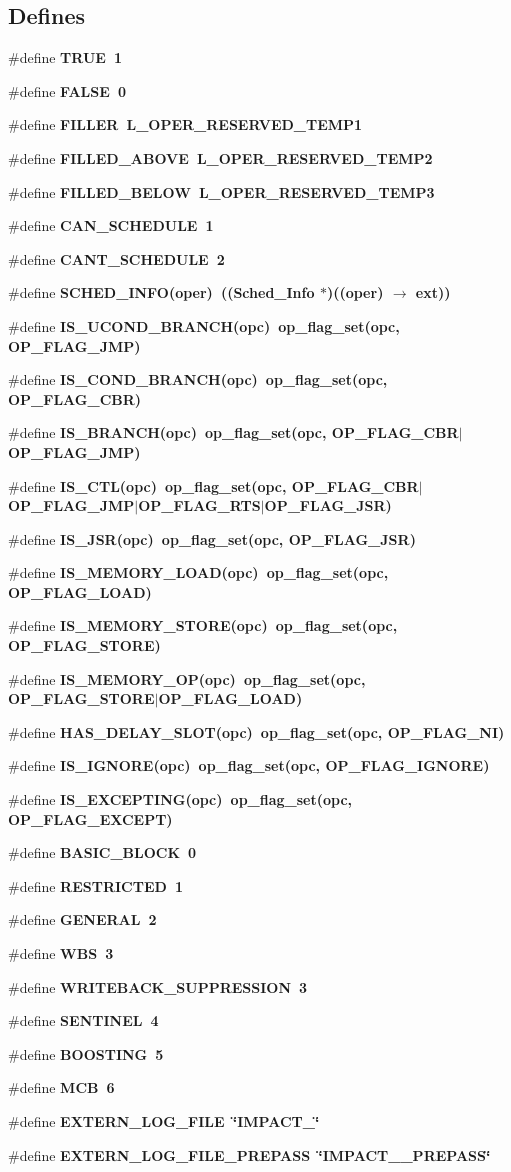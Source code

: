 \subsection*{Defines}
\begin{CompactItemize}
\item 
\#define \bf{TRUE}~1
\item 
\#define \bf{FALSE}~0
\item 
\#define \bf{FILLER}~L\_\-OPER\_\-RESERVED\_\-TEMP1
\item 
\#define \bf{FILLED\_\-ABOVE}~L\_\-OPER\_\-RESERVED\_\-TEMP2
\item 
\#define \bf{FILLED\_\-BELOW}~L\_\-OPER\_\-RESERVED\_\-TEMP3
\item 
\#define \bf{CAN\_\-SCHEDULE}~1
\item 
\#define \bf{CANT\_\-SCHEDULE}~2
\item 
\#define \bf{SCHED\_\-INFO}(oper)~((\bf{Sched\_\-Info} $\ast$)((oper) $\rightarrow$ ext))
\item 
\#define \bf{IS\_\-UCOND\_\-BRANCH}(opc)~op\_\-flag\_\-set(opc, OP\_\-FLAG\_\-JMP)
\item 
\#define \bf{IS\_\-COND\_\-BRANCH}(opc)~op\_\-flag\_\-set(opc, OP\_\-FLAG\_\-CBR)
\item 
\#define \bf{IS\_\-BRANCH}(opc)~op\_\-flag\_\-set(opc, OP\_\-FLAG\_\-CBR$|$OP\_\-FLAG\_\-JMP)
\item 
\#define \bf{IS\_\-CTL}(opc)~op\_\-flag\_\-set(opc, OP\_\-FLAG\_\-CBR$|$OP\_\-FLAG\_\-JMP$|$OP\_\-FLAG\_\-RTS$|$OP\_\-FLAG\_\-JSR)
\item 
\#define \bf{IS\_\-JSR}(opc)~op\_\-flag\_\-set(opc, OP\_\-FLAG\_\-JSR)
\item 
\#define \bf{IS\_\-MEMORY\_\-LOAD}(opc)~op\_\-flag\_\-set(opc, OP\_\-FLAG\_\-LOAD)
\item 
\#define \bf{IS\_\-MEMORY\_\-STORE}(opc)~op\_\-flag\_\-set(opc, OP\_\-FLAG\_\-STORE)
\item 
\#define \bf{IS\_\-MEMORY\_\-OP}(opc)~op\_\-flag\_\-set(opc, OP\_\-FLAG\_\-STORE$|$OP\_\-FLAG\_\-LOAD)
\item 
\#define \bf{HAS\_\-DELAY\_\-SLOT}(opc)~op\_\-flag\_\-set(opc, OP\_\-FLAG\_\-NI)
\item 
\#define \bf{IS\_\-IGNORE}(opc)~op\_\-flag\_\-set(opc, OP\_\-FLAG\_\-IGNORE)
\item 
\#define \bf{IS\_\-EXCEPTING}(opc)~op\_\-flag\_\-set(opc, OP\_\-FLAG\_\-EXCEPT)
\item 
\#define \bf{BASIC\_\-BLOCK}~0
\item 
\#define \bf{RESTRICTED}~1
\item 
\#define \bf{GENERAL}~2
\item 
\#define \bf{WBS}~3
\item 
\#define \bf{WRITEBACK\_\-SUPPRESSION}~3
\item 
\#define \bf{SENTINEL}~4
\item 
\#define \bf{BOOSTING}~5
\item 
\#define \bf{MCB}~6
\item 
\#define \bf{EXTERN\_\-LOG\_\-FILE}~\char`\"{}IMPACT\_\char`\"{}
\item 
\#define \bf{EXTERN\_\-LOG\_\-FILE\_\-PREPASS}~\char`\"{}IMPACT\_\_\-PREPASS\char`\"{}
\end{CompactItemize}
